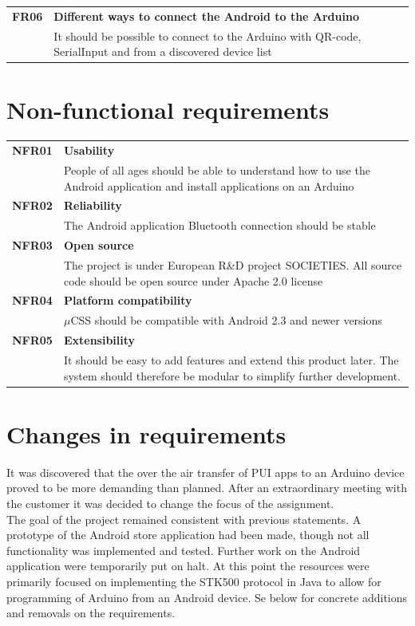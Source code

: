 \begin{table}[H]
\begin{tabularx}{\linewidth}{lX}
        \textbf{FR06} & \textbf{Different ways to connect the Android to the Arduino}\\
                      & It should be possible to connect to the Arduino with QR-code, SerialInput and from a discovered device list\\

	\end{tabularx}
	\end{table}

\section{Non-functional requirements}
\label{non-functional}
	\begin{table}[H]
	\begin{tabularx}{\linewidth}{lX}
		\textbf{NFR01} & \textbf{Usability}\\
		 & People of all ages should be able to understand how to use the Android application and install applications on an Arduino\\
		\textbf{NFR02} & \textbf{Reliability}\\
		 & The Android application  Bluetooth connection should be stable\\
		\textbf{NFR03} & \textbf{Open source}\\
		 & The project is under European R\&D project SOCIETIES. All source code should be open source under Apache 2.0 license\\
		\textbf{NFR04} & \textbf{Platform compatibility}\\
		 & $\mu$CSS should be compatible with Android 2.3 and newer versions\\
		\textbf{NFR05} & \textbf{Extensibility}\\
		 & It should be easy to add features and extend this product later. The system should therefore be modular to simplify further development.\\
	\end{tabularx}
	\end{table}

\section{Changes in requirements}
It was discovered that the over the air transfer of PUI apps to an Arduino device proved to be more demanding than planned. After an extraordinary meeting with the customer it was decided to change the focus of the assignment. \\
\newline
The goal of the project remained consistent with previous statements. A prototype of the Android store application had been made, though not all functionality was implemented and tested. Further work on the Android application were temporarily put on halt. At this point the resources were primarily focused on implementing the STK500 protocol in Java to allow for programming of Arduino from an Android device. Se below for concrete additions and removals on the requirements.

